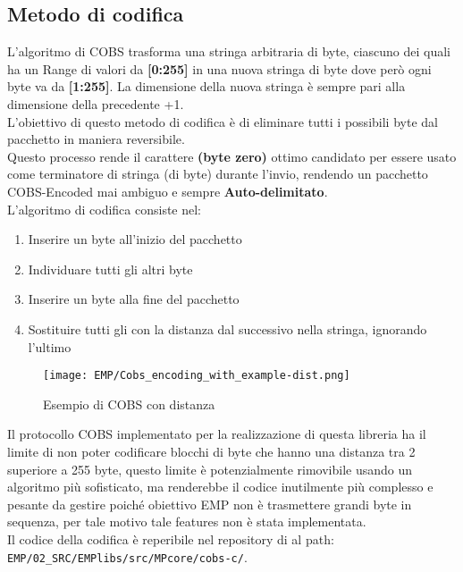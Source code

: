 \subsection{Metodo di codifica}
L'algoritmo di COBS trasforma una stringa arbitraria di byte, ciascuno dei quali ha un Range di valori da \textbf{[0:255]} in una nuova stringa di byte dove però ogni byte va da \textbf{[{\color{red}1}:255]}. La dimensione della nuova stringa è sempre pari alla dimensione della precedente +1.\\
L'obiettivo di questo metodo di codifica è di eliminare tutti i possibili byte \zeroByte dal pacchetto in maniera reversibile.\\
Questo processo rende il carattere \textbf{\zeroByte (byte zero)} ottimo candidato per essere usato come terminatore di stringa (di byte) durante l'invio, rendendo un pacchetto COBS-Encoded mai ambiguo e sempre \textbf{Auto-delimitato}.\\
L'algoritmo di codifica consiste nel:\vspace{-5mm}
\begin{enumerate} [itemsep=-3mm]
	\item Inserire un byte \zeroByte all'inizio del pacchetto
	\item Individuare tutti gli altri byte \zeroByte
	\item Inserire un byte \zeroByte alla fine del pacchetto
	\item Sostituire tutti gli \zeroByte con la distanza dal successivo \zeroByte nella stringa, ignorando l'ultimo
\end{enumerate}\vspace{-8mm}

\begin{figure}[H]
	\centering
	\caption[Esempio di COBS con distanza]{Esempio di COBS con distanza}
	\vspace{1mm}
	\texttt{[image: EMP/Cobs\_encoding\_with\_example-dist.png]}
\end{figure}
\noindent
Il protocollo COBS implementato per la realizzazione di questa libreria ha il limite di non poter codificare blocchi di byte che hanno una distanza tra 2 \zeroByte superiore a 255 byte, questo limite è potenzialmente rimovibile usando un algoritmo più sofisticato, ma renderebbe il codice inutilmente più complesso e pesante da gestire poiché obiettivo EMP non è trasmettere grandi byte in sequenza, per tale motivo tale features non è stata implementata.\\
Il codice della codifica è reperibile nel repository di \cite*{EMP} al path:\\ \verb*|EMP/02_SRC/EMPlibs/src/MPcore/cobs-c/|.

